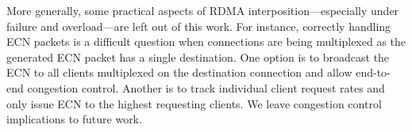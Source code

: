 
More generally, some practical aspects of RDMA
interposition---especially under failure and overload---are left out
of this work. For instance, correctly handling ECN packets is a
difficult question when connections are being multiplexed as the
generated ECN packet has a single destination. One option is to
broadcast the ECN to all clients multiplexed on the destination
connection and allow end-to-end congestion control. Another is to track individual client request rates and only issue ECN to the
highest requesting clients. We leave congestion
control implications to future work.

